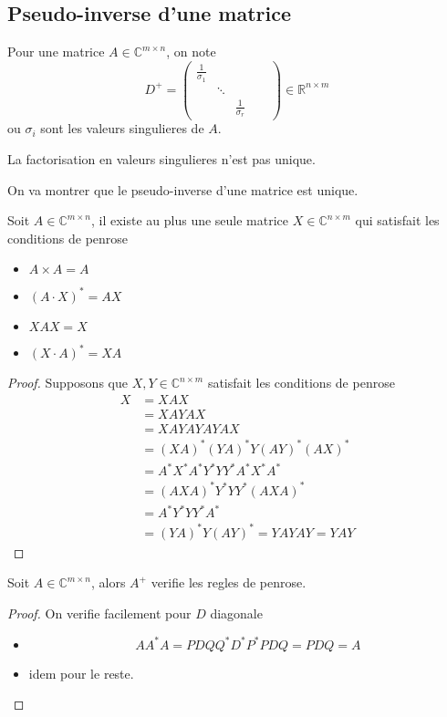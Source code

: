 \documentclass[../main.tex]{subfiles}
\begin{document}
\subsection{Pseudo-inverse d'une matrice}
\begin{defn}
	Pour une matrice $A\in \mathbb{C}^{m \times n}$, on note
	\[ 
	D^{+} =
	\begin{pmatrix}
		\frac{1}{\sigma_1} & & &\\
				   & \ddots & & &\\
				   & & \frac{1}{\sigma_r} & &
	\end{pmatrix} 
	\in \mathbb{R}^{n\times m}
	\]
	ou  $\sigma_i$ sont les valeurs singulieres de $A$.
\end{defn}
\begin{rmq}
La factorisation en valeurs singulieres n'est pas unique.
\end{rmq}
On va montrer que le pseudo-inverse d'une matrice est unique.\\
\begin{thm}
Soit $A \in \mathbb{C}^{m\times n}$, il existe au plus une seule matrice $X \in \mathbb{C}^{n\times m}$ qui satisfait les conditions de penrose
\begin{itemize}
\item $A \times A = A$ 
\item $( A \cdot X) ^{*}= A X $ 
\item $XAX=X$ 
\item $( X \cdot A) ^{*}= XA$
\end{itemize}

\end{thm}
\begin{proof}
Supposons que $X,Y \in \mathbb{C}^{n\times m}$ satisfait les conditions de penrose
\begin{align*}
X &= XAX\\
&= XAYAX\\
&=XAYAYAYAX\\
&= ( XA) ^{*}( YA) ^{*} Y (AY ) ^{*}( AX) ^{*}\\
&= A^{*}X^{*}A^{*} Y^{*}Y Y^{*}A^{*}X^{*}A^{*}\\
&= ( AXA) ^{*}Y^{*} Y Y^{*} ( AXA) ^{*}\\
&= A^{*}Y^{*}Y Y^{*} A^{*}\\
&= ( YA) ^{*}Y ( AY) ^{*}= YAYAY = YAY
\end{align*}

\end{proof}
\begin{thm}
Soit $A \in \mathbb{C}^{m\times n}$, alors $A^{+}$ verifie les regles de penrose.
\end{thm}
\begin{proof}
On verifie facilement pour $D$ diagonale
\begin{itemize}
\item 
	\[ 
	A A^{*}A = PDQQ^{*} D^{*}P^{*}P DQ = PDQ =A
	\]

\item idem pour le reste.
	
\end{itemize}

\end{proof}
\end{document}
